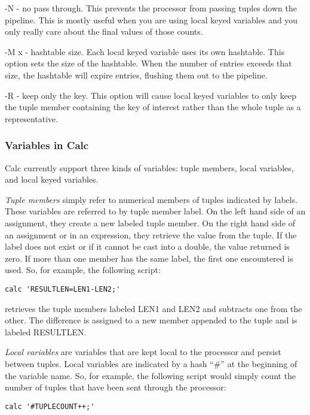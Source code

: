 \documentclass[11pt]{article}
\begin{document}
-N - no pass through.  This prevents the processor from passing tuples down the pipeline.
This is mostly useful when you are using local keyed variables and you only really care
about the final values of those counts. 

-M x - hashtable size.  Each local keyed variable uses its own hashtable.  This option
sets the size of the hashtable.  When the number of entries exceeds that size, the
hashtable will expire entries, flushing them out to the pipeline.

-R - keep only the key.  This option will cause local keyed variables to only keep the
tuple member containing the key of interest rather than the whole tuple as a 
representative. 

\subsubsection {Variables in Calc}
Calc currently support three kinds of variables: tuple members, local variables, and local 
keyed variables.  

\emph{Tuple members} simply refer to numerical members of tuples indicated by labels.  These 
variables are referred to by tuple member label.  On the left hand side of an assignment,
they create a new labeled tuple member.  On the right hand side of an assignment or in
an expression, they retrieve the value from the tuple.  If the label does not exist
or if it cannot be cast into a double, the value returned is zero.  If more than one member
has the same label, the first one encountered is used. So, for example, the following
script:

\begin{lstlisting}
calc 'RESULTLEN=LEN1-LEN2;'
\end{lstlisting}

retrieves the tuple members labeled LEN1 and LEN2 and subtracts one from the other.
The difference is assigned to a new member appended to the tuple and is labeled RESULTLEN.

\emph{Local variables} are variables that are kept local to the processor and persist between
tuples.  Local variables are indicated by a hash ``\#'' at the beginning of the variable name.
 So, for example, the following script would simply count the number of tuples that
have been sent through the processor:

\begin{lstlisting}
calc '#TUPLECOUNT++;'
\end{lstlisting}
\end{document}
